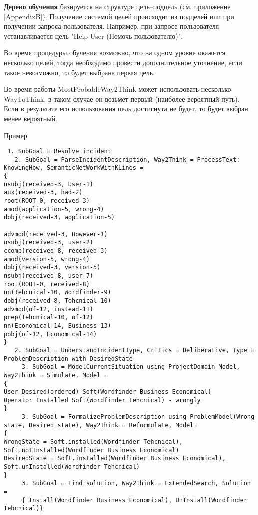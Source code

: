 \textbf{Дерево обучения} базируется на структуре цель--подцель (см. приложение \ref{AppendixB}). Получение системой целей происходит из подцелей или при получении запроса пользователя. Например, при запросе пользователя устанавливается цель "Help User (Помочь пользователю)".\par

Во время процедуры обучения возможно, что на одном уровне окажется несколько целей, тогда необходимо провести дополнительное уточнение, если такое невозможно, то будет выбрана первая цель.


Во время работы MostProbableWay2Think может использовать несколько WayToThink, в таком случае он возьмет первый (наиболее вероятный путь). Если в результате его использования цель достигнута не будет, то будет выбран менее вероятный.

Пример
\begin{lstlisting}
 1. SubGoal = Resolve incident
   2. SubGoal = ParseIncidentDescription, Way2Think = ProcessText: KnowingHow, SemanticNetWorkWithKLines =
{
nsubj(received-3, User-1)
aux(received-3, had-2)
root(ROOT-0, received-3)
amod(application-5, wrong-4)
dobj(received-3, application-5)

advmod(received-3, However-1)
nsubj(received-3, user-2)
ccomp(received-8, received-3)
amod(version-5, wrong-4)
dobj(received-3, version-5)
nsubj(received-8, user-7)
root(ROOT-0, received-8)
nn(Tehcnical-10, Wordfinder-9)
dobj(received-8, Tehcnical-10)
advmod(of-12, instead-11)
prep(Tehcnical-10, of-12)
nn(Economical-14, Business-13)
pobj(of-12, Economical-14)
}
   2. SubGoal = UnderstandIncidentType, Critics = Deliberative, Type = ProblemDescription with DesiredState
     3. SubGoal = ModelCurrentSituation using ProjectDomain Model, Way2Think = Simulate, Model =
{
User Desired(ordered) Soft(Wordfinder Business Economical)
Operator Installed Soft(Wordfinder Tehcnical) - wrongly
}
     3. SubGoal = FormalizeProblemDescription using ProblemModel(Wrong state, Desired state), Way2Think = Reformulate, Model=
{
WrongState = Soft.installed(Wordfinder Tehcnical), Soft.notInstalled(Wordfinder Business Economical)
DesiredState = Soft.installed(Wordfinder Business Economical), Soft.unInstalled(Wordfinder Tehcnical)
}
     3. SubGoal = Find solution, Way2Think = ExtendedSearch, Solution =
     { Install(Wordfinder Business Economical), UnInstall(Wordfinder Tehcnical)}
     
\end{lstlisting}
\clearpage

